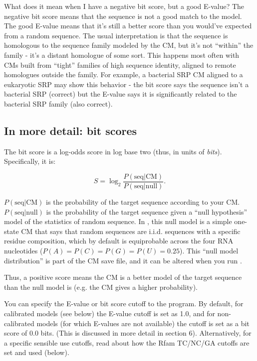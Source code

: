 \begin{srefaq}{What does it mean when I have a negative bit score,
    but a good E-value?} The negative bit score means that the sequence is
  not a good match to the model. The good E-value means that it's still
  a better score than you would've expected from a random sequence. The
  usual interpretation is that the sequence is homologous to the
  sequence family modeled by the CM, but it's not ``within'' the family
  - it's a distant homologue of some sort. This happens most often with
  CMs built from ``tight'' families of high sequence identity, aligned
  to remote homologues outside the family. For example, a bacterial SRP
  CM aligned to a eukaryotic SRP may show this behavior - the bit
  score says the sequence isn't a bacterial SRP (correct) but the E-value says
  it is significantly related to the bacterial SRP family (also correct).
\end{srefaq}

\subsection{In more detail:  bit scores}

The bit score is a log-odds score in log base two (thus, in units of
{\em bits}). Specifically, it is:

\[
S = \log_2 \frac {P( \mbox{seq} | \mbox{CM})} { P (\mbox{seq} |
  \mbox{null})}.
\]

$P( \mbox{seq} | \mbox{CM})$ is the probability of the target
sequence according to your CM. $ P (\mbox{seq} | \mbox{null}) $ is
the probability of the target sequence given a ``null hypothesis''
model of the statistics of random sequence. In , this null model
is a simple one-state CM that says that random sequences are i.i.d.
sequences with a specific residue composition, which by default is
equiprobable across the four RNA nucleotides ($P(A) = P(C) = P(G) =
P(U) = 0.25$). This ``null model distribution'' is part of the CM save
file, and it can be altered when you run .

Thus, a positive score means the CM is a better model of the target
sequence than the null model is (e.g. the CM gives a higher
probability).

You can specify the E-value or bit score cutoff to the 
program. By default, for calibrated models (see below) the E-value
cutoff is set as 1.0, and for non-calibrated models (for which
E-values are not available) the cutoff is set as a bit score of 0.0
bits. (This is discussed in more detail in section 6). Alternatively,
for a specific sensible use cutoffs, read about how the Rfam
TC/NC/GA cutoffs are set and used (below).


